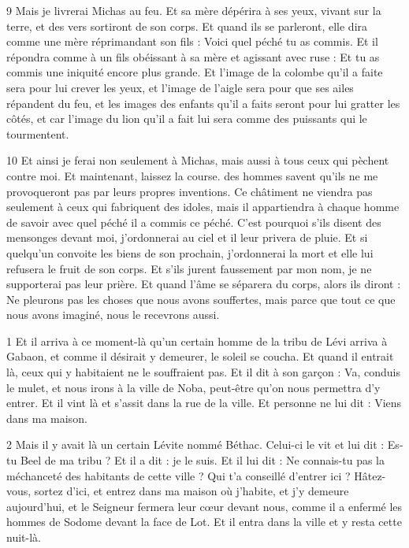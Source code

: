 \par 9 Mais je livrerai Michas au feu. Et sa mère dépérira à ses yeux, vivant sur la terre, et des vers sortiront de son corps. Et quand ils se parleront, elle dira comme une mère réprimandant son fils : Voici quel péché tu as commis. Et il répondra comme à un fils obéissant à sa mère et agissant avec ruse : Et tu as commis une iniquité encore plus grande. Et l'image de la colombe qu'il a faite sera pour lui crever les yeux, et l'image de l'aigle sera pour que ses ailes répandent du feu, et les images des enfants qu'il a faits seront pour lui gratter les côtés, et car l'image du lion qu'il a fait lui sera comme des puissants qui le tourmentent.

\par 10 Et ainsi je ferai non seulement à Michas, mais aussi à tous ceux qui pèchent contre moi. Et maintenant, laissez la course. des hommes savent qu’ils ne me provoqueront pas par leurs propres inventions. Ce châtiment ne viendra pas seulement à ceux qui fabriquent des idoles, mais il appartiendra à chaque homme de savoir avec quel péché il a commis ce péché. C'est pourquoi s'ils disent des mensonges devant moi, j'ordonnerai au ciel et il leur privera de pluie. Et si quelqu'un convoite les biens de son prochain, j'ordonnerai la mort et elle lui refusera le fruit de son corps. Et s’ils jurent faussement par mon nom, je ne supporterai pas leur prière. Et quand l'âme se séparera du corps, alors ils diront : Ne pleurons pas les choses que nous avons souffertes, mais parce que tout ce que nous avons imaginé, nous le recevrons aussi.


\par 1 Et il arriva à ce moment-là qu'un certain homme de la tribu de Lévi arriva à Gabaon, et comme il désirait y demeurer, le soleil se coucha. Et quand il entrait là, ceux qui y habitaient ne le souffraient pas. Et il dit à son garçon : Va, conduis le mulet, et nous irons à la ville de Noba, peut-être qu'on nous permettra d'y entrer. Et il vint là et s'assit dans la rue de la ville. Et personne ne lui dit : Viens dans ma maison.

\par 2 Mais il y avait là un certain Lévite nommé Béthac. Celui-ci le vit et lui dit : Es-tu Beel de ma tribu ? Et il a dit : je le suis. Et il lui dit : Ne connais-tu pas la méchanceté des habitants de cette ville ? Qui t'a conseillé d'entrer ici ? Hâtez-vous, sortez d'ici, et entrez dans ma maison où j'habite, et j'y demeure aujourd'hui, et le Seigneur fermera leur cœur devant nous, comme il a enfermé les hommes de Sodome devant la face de Lot. Et il entra dans la ville et y resta cette nuit-là.

